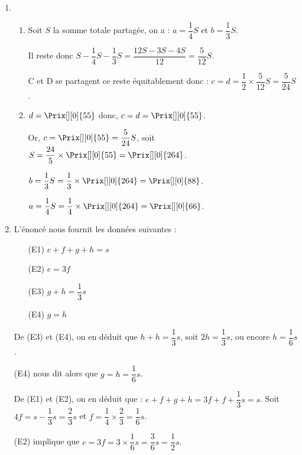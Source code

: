 \begin{enumerate}
    \item
       \begin{enumerate}
          \item Soit $S$ la somme totale partagée, on a : $a =\dfrac14S$ et $b =\dfrac13S$. \par \smallskip
             Il reste donc $S-\dfrac14S-\dfrac13S =\dfrac{12S-3S-4S}{12} =\dfrac{5}{12}S$. \par \smallskip
             C et D se partagent ce reste équitablement donc : $c =d =\dfrac12\times\dfrac{5}{12}S =\dfrac{5}{24}S$. \par
              \smallskip
          \item $d =\Prix[][0]{55}$ donc, $c =d =\Prix[][0]{55}$. \par \smallskip
             Or, $c =\Prix[][0]{55} =\dfrac{5}{24}S$, soit $S =\dfrac{24}{5}\times\Prix[][0]{55} =\Prix[][0]{264}$. \par \smallskip
             $b =\dfrac13S =\dfrac13\times\Prix[][0]{264} =\Prix[][0]{88}$. \par \smallskip
             $a =\dfrac14S =\dfrac14\times\Prix[][0]{264} =\Prix[][0]{66}$. \par \medskip
       \end{enumerate}
    \item L'énoncé nous fournit les données suivantes :
       \begin{itemize}
          \item[(E1)] $e+f+g+h =s$
          \item[(E2)] $e =3f$
          \item[(E3)] $g+h =\dfrac13s$
          \item[(E4)] $g =h$
       \end{itemize}
       De (E3) et (E4), on en déduit que $h+h =\dfrac13s$, soit $2h=\dfrac13s$, ou encore $h=\dfrac16s$. \par
       (E4) nous dit alors que $g =h =\dfrac16s$. \par
       De (E1) et (E2), on en déduit que : $e+f+g+h =3f+f+\dfrac13s =s$. Soit $4f =s-\dfrac13s =\dfrac23s$ et $f =\dfrac14\times\dfrac2{3} =\dfrac16s$. \par
       (E2) implique que $e =3f =3\times\dfrac16s =\dfrac36s =\dfrac12s$. \par \smallskip
 \end{enumerate}